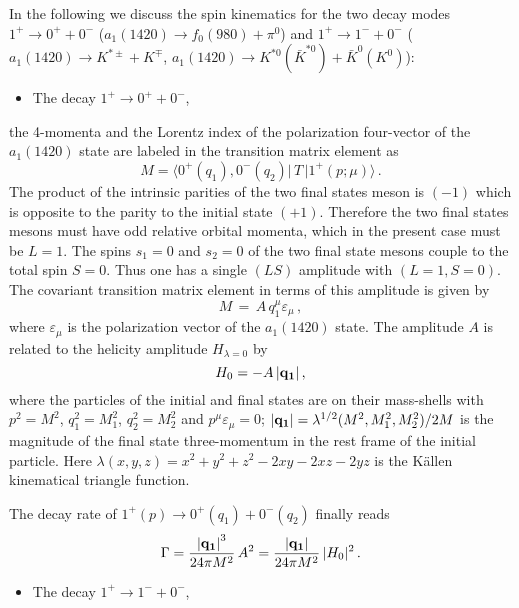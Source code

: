 \documentclass[aps,prd,floatfix,superscriptaddress,showpacs,showkeys]{revtex4}
\newcommand{\bea}{\begin{eqnarray}}
\newcommand{\ena}{\end{eqnarray}}
\newcommand{\be}{\begin{equation}}
\newcommand{\en}{\end{equation}}
\begin{document}
In the following we discuss the spin kinematics for the two decay modes
$1^{+} \to 0^{+} + 0^{-}$ ($a_1(1420) \to f_0(980) + \pi^0$)
and
$1^{+} \to 1^{-} + 0^{-}$ ($a_1(1420) \to K^{*\pm} + K^\mp$, 
$a_1(1420) \to K^{*0}(\bar K^{*0}) + \bar K^0(K^0)$):
 
\begin{itemize}
\item The decay $1^+\to 0^+ + 0^-$,
\end{itemize}

the 4-momenta and the Lorentz index of the polarization four-vector of 
the $a_1(1420)$ state are labeled in the transition matrix element as
\be
M=\langle 0^+ (q_1), 0^-(q_2) |\,T\,|1^+(p;\mu)\rangle \,.
\label{eq:ma1f0pi}
\en
The product of the intrinsic parities of the two final states meson is 
$(-1)$ which is opposite to the parity to the initial 
state $(+1)$. Therefore the two final states mesons must have 
odd relative orbital momenta, which in the present case must be $L=1$. 
The spins $s_1 = 0$ and $s_2 = 0$ of the two final state mesons couple to
the total spin $S=0$. Thus one has a single $(LS)$ amplitude with $(L=1,S=0)$. 
The covariant transition matrix element in terms of this amplitude is given by
\be
M\,=\,A\, q_1^\mu \varepsilon_\mu\,, 
\label{eq:Af0pi}
\en
where $\varepsilon_\mu$ is the polarization vector of the $a_1(1420)$ state. 
The amplitude $A$ is related to the helicity amplitude 
$H_{\lambda=0}$ by 
\be 
H_0 = - A \, {|\bf q_1|}\,, 
\en 
where the particles of the initial and final states are on their mass-shells
with $p^2=M^2$, $q_1^2=M_1^2$, $q_2^2=M_2^2$ and $p^\mu\varepsilon_\mu=0$;  
$|{\bf q_1}|=\lambda^{1/2}(M^2,M_1^2,M_2^2)/2M$ 
is the magnitude of the final state three-momentum 
in the rest frame of the initial particle. 
Here 
$\lambda(x,y,z) = x^2 + y^2 + z^2 - 2xy - 2xz - 2yz$ is 
the K\"allen kinematical triangle function. 

The decay rate of $1^+(p)\to 0^+(q_1) + 0^-(q_2)$ finally reads
\bea
\Gamma = 
\frac{{\bf|q_1|}^3}{24\pi M^2} \, A^2 
= \frac{\bf|q_1|}{24\pi M^2} \, |H_0|^2 \, . 
\label{eq:widtha1f0pi} 
\ena

\begin{itemize}
\item The decay $1^+\to 1^- + 0^-$,
\end{itemize}
\end{document}
